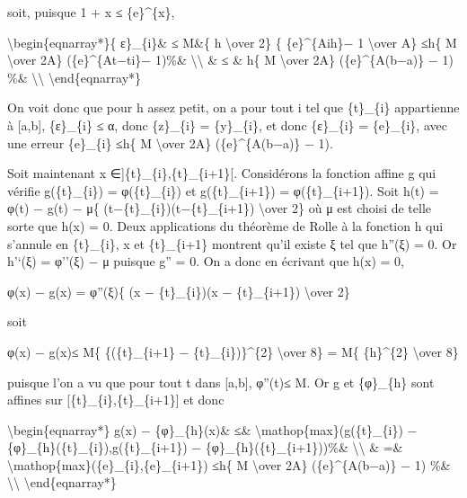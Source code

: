 \documentclass[]{article}
\begin{document}
soit, puisque 1 + x ≤ \{e\}\^{}\{x\},

\textbackslash{}begin\{eqnarray*\}\{ ε\}\_\{i\}\& ≤ M\&\{
\textbar{}h\textbar{} \textbackslash{}over 2\} \{
\{e\}\^{}\{Ai\textbar{}h\textbar{}\}− 1 \textbackslash{}over A\}
≤\textbar{}h\textbar{}\{ M \textbackslash{}over 2A\}
(\{e\}\^{}\{A\textbar{}t−ti\textbar{}\}− 1)\%\&
\textbackslash{}\textbackslash{} \& ≤ \& \textbar{}h\textbar{}\{ M
\textbackslash{}over 2A\} (\{e\}\^{}\{A(b−a)\} − 1) \%\&
\textbackslash{}\textbackslash{} \textbackslash{}end\{eqnarray*\}

On voit donc que pour h assez petit, on a pour tout i tel que
\{t\}\_\{i\} appartienne à {[}a,b{]}, \{ε\}\_\{i\} ≤ α, donc
\{z\}\_\{i\} = \{y\}\_\{i\}, et donc \{ε\}\_\{i\} = \{e\}\_\{i\}, avec
une erreur \{e\}\_\{i\} ≤\textbar{}h\textbar{}\{ M \textbackslash{}over
2A\} (\{e\}\^{}\{A(b−a)\} − 1).

Soit maintenant x ∈{]}\{t\}\_\{i\},\{t\}\_\{i+1\}{[}. Considérons la
fonction affine g qui vérifie g(\{t\}\_\{i\}) = φ(\{t\}\_\{i\}) et
g(\{t\}\_\{i+1\}) = φ(\{t\}\_\{i+1\}). Soit h(t) = φ(t) − g(t) − μ\{
(t−\{t\}\_\{i\})(t−\{t\}\_\{i+1\}) \textbackslash{}over 2\} où μ est
choisi de telle sorte que h(x) = 0. Deux applications du théorème de
Rolle à la fonction h qui s'annule en \{t\}\_\{i\}, x et \{t\}\_\{i+1\}
montrent qu'il existe ξ tel que h''(ξ) = 0. Or h'`(ξ) = φ''(ξ) − μ
puisque g'' = 0. On a donc en écrivant que h(x) = 0,

φ(x) − g(x) = φ''(ξ)\{ (x − \{t\}\_\{i\})(x − \{t\}\_\{i+1\})
\textbackslash{}over 2\}

soit

\textbar{}φ(x) − g(x)\textbar{}≤ M\{ \{(\{t\}\_\{i+1\} −
\{t\}\_\{i\})\}\^{}\{2\} \textbackslash{}over 8\} = M\{ \{h\}\^{}\{2\}
\textbackslash{}over 8\}

puisque l'on a vu que pour tout t dans {[}a,b{]},
\textbar{}φ''(t)\textbar{}≤ M. Or g et \{φ\}\_\{h\} sont affines sur
{[}\{t\}\_\{i\},\{t\}\_\{i+1\}{]} et donc

\textbackslash{}begin\{eqnarray*\} \textbar{}g(x) −
\{φ\}\_\{h\}(x)\textbar{}\& ≤\&
\textbackslash{}mathop\{max\}(\textbar{}g(\{t\}\_\{i\}) −
\{φ\}\_\{h\}(\{t\}\_\{i\})\textbar{},\textbar{}g(\{t\}\_\{i+1\}) −
\{φ\}\_\{h\}(\{t\}\_\{i+1\})\textbar{})\%\&
\textbackslash{}\textbackslash{} \& =\&
\textbackslash{}mathop\{max\}(\{e\}\_\{i\},\{e\}\_\{i+1\})
≤\textbar{}h\textbar{}\{ M \textbackslash{}over 2A\}
(\{e\}\^{}\{A(b−a)\} − 1) \%\& \textbackslash{}\textbackslash{}
\textbackslash{}end\{eqnarray*\}
\end{document}
